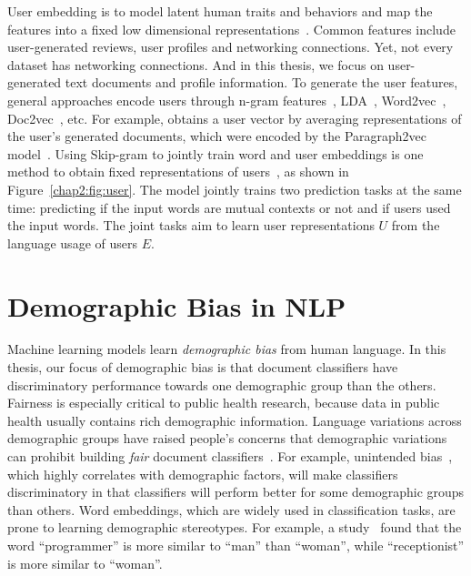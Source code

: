User embedding is to model latent human traits and behaviors and map the features into a fixed low dimensional representations~\cite{pan2019social}. 
Common features include user-generated reviews, user profiles and networking connections. 
Yet, not every dataset has networking connections. 
And in this thesis, we focus on user-generated text documents and profile information.
To generate the user features, general approaches encode users through n-gram features~\cite{benton2016learning}, LDA~\cite{zhang2015using, ding2017multi}, Word2vec~\cite{amir2016modelling, benton2016learning, amir2017quantifying, wu2018starspace}, Doc2vec~\cite{ding2017multi, ding2018predicting}, etc.
For example, \cite{ding2018predicting} obtains a user vector by averaging representations of the user's generated documents, which were encoded by the Paragraph2vec model~\cite{le2014distributed}.
Using Skip-gram to jointly train word and user embeddings is one method to obtain fixed representations of users~\cite{amir2017quantifying}, as shown in Figure~\ref{chap2:fig:user}.
The model jointly trains two prediction tasks at the same time: predicting if the input words are mutual contexts or not and if users used the input words.
The joint tasks aim to learn user representations $U$ from the language usage of users $E$.


\section{Demographic Bias in NLP}

Machine learning models learn \textit{demographic bias} from human language.
In this thesis, our focus of demographic bias is that document classifiers have discriminatory performance towards one demographic group than the others.
Fairness is especially critical to public health research, because data in public health usually contains rich demographic information.
Language variations across demographic groups have raised people's concerns that demographic variations can prohibit building \textit{fair} document classifiers~\cite{sun2019mitigating, bender2018data}. 
For example, unintended bias~\cite{dixon2018measuring}, which highly correlates with demographic factors, will make classifiers discriminatory in that classifiers will perform better for some demographic groups than others. 
Word embeddings, which are widely used in classification tasks, are prone to learning demographic stereotypes.
For example, a study~\cite{bolukbasi2016man} found that the word ``programmer'' is more similar to ``man'' than ``woman'', while ``receptionist'' is more similar to ``woman''.



